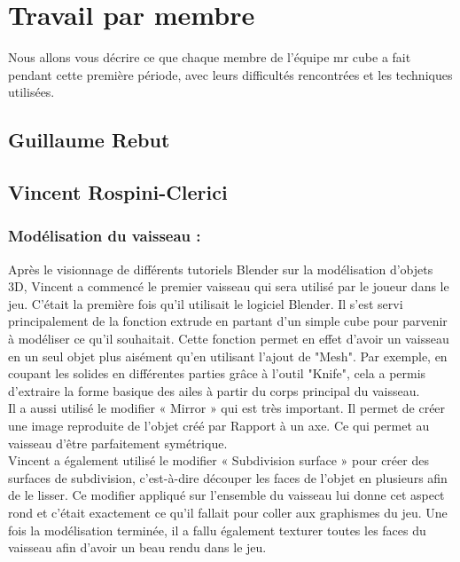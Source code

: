 \documentclass[10pt, titlepage]{report}
\begin{document}
\chapter{Travail par membre}
Nous allons vous décrire ce que chaque membre de l'équipe mr cube a fait pendant cette première période, avec leurs difficultés rencontrées et les techniques utilisées.

\section{Guillaume Rebut}

\section{Vincent Rospini-Clerici}

\subsection{Modélisation du vaisseau :}

Après le visionnage de différents tutoriels Blender sur la modélisation d'objets 3D, Vincent a commencé le premier vaisseau qui sera utilisé par le joueur dans le jeu. C'était la première fois qu'il utilisait le logiciel Blender. Il s'est servi principalement de la fonction extrude en partant d'un simple cube pour parvenir à modéliser ce qu'il souhaitait. Cette fonction permet en effet d'avoir un vaisseau en un seul objet plus aisément qu'en utilisant l'ajout de "Mesh". Par exemple, en coupant les solides en différentes parties grâce à l'outil "Knife", cela a permis d'extraire la forme basique des ailes à partir du corps principal du vaisseau.\\

Il a aussi utilisé le modifier « Mirror » qui est très important. Il permet de créer une image reproduite de l’objet créé par Rapport à un axe. Ce qui permet au vaisseau d'être parfaitement symétrique.\\

Vincent a également utilisé le modifier « Subdivision surface » pour créer des surfaces de subdivision, c’est-à-dire découper les faces de l’objet en plusieurs afin de le lisser. Ce modifier appliqué sur l’ensemble du vaisseau lui donne cet aspect rond et c’était exactement ce qu’il fallait pour coller aux graphismes du jeu.
Une fois la modélisation terminée, il a fallu également texturer toutes les faces du vaisseau afin d'avoir un beau rendu dans le jeu. \\
\end{document}

